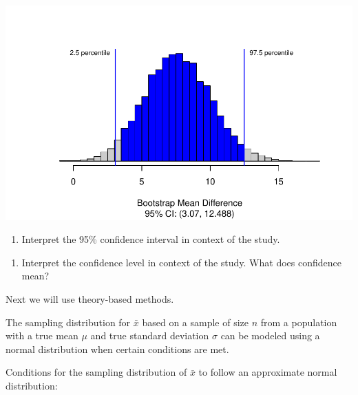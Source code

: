 \documentclass[
]{report}
\providecommand{\tightlist}{%
  \setlength{\itemsep}{0pt}\setlength{\parskip}{0pt}}
\begin{document}
\begin{center}\includegraphics[width=0.7\linewidth]{14-UR-module11_review_files/figure-latex/unnamed-chunk-4-1} \end{center}

\begin{enumerate}
\def\labelenumi{\arabic{enumi}.}
\setcounter{enumi}{9}
\tightlist
\item
  Interpret the 95\% confidence interval in context of the study.
\end{enumerate}

\vspace{0.8in}

\begin{enumerate}
\def\labelenumi{\arabic{enumi}.}
\setcounter{enumi}{10}
\tightlist
\item
  Interpret the confidence level in context of the study. What does confidence mean?
\end{enumerate}

\vspace{0.8in}

Next we will use theory-based methods.

The sampling distribution for \(\bar{x}\) based on a sample of size \(n\) from a population with a true mean \(\mu\) and true standard deviation \(\sigma\) can be modeled using a normal distribution when certain conditions are met.

Conditions for the sampling distribution of \(\bar{x}\) to follow an approximate normal distribution:
\end{document}

